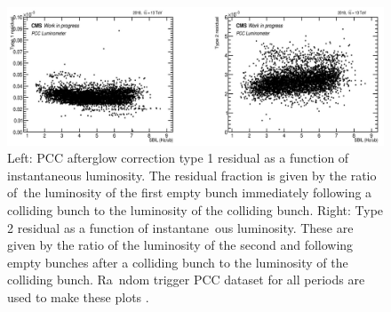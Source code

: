\begin{itemize}

\begin{figure}[h]
  \centering
  \includegraphics[width=1\textwidth]{ashish_thesis/type1res_gr0p5_1.png}
  \caption[PCC Afterglow Residuals]{Left: PCC afterglow correction type 1 residual as a function of instantaneous luminosity. The residual fraction is given by the ratio of\
 the luminosity of the first empty bunch immediately following a colliding bunch to the luminosity of the colliding bunch. Right: Type 2 residual as a function of instantane\
ous luminosity. These are given by the ratio of the luminosity of the second and following empty bunches after a colliding bunch to the luminosity of the colliding bunch. Ra\
ndom trigger PCC dataset for all periods are used to make these plots \cite{Sehrawat2023}.}
  \label{fig:stabprof_4012}
\end{figure}




\end{itemize}
